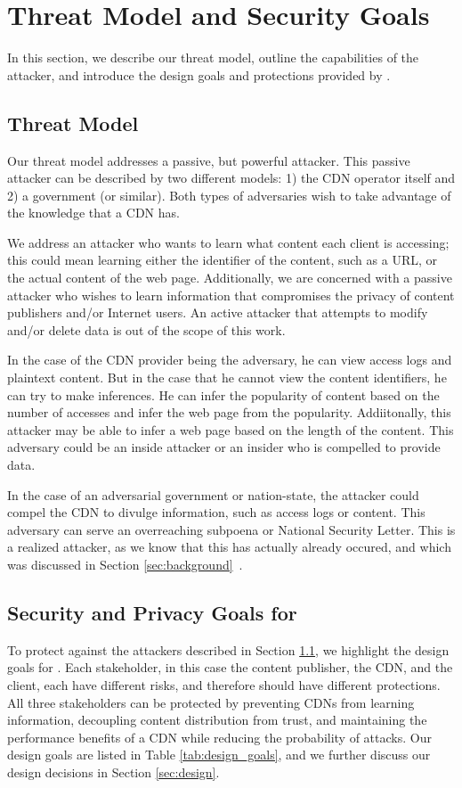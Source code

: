 \section{Threat Model and Security Goals}
\label{sec:threat}
In this section, we describe our threat model, outline the capabilities of the 
attacker, and introduce the design goals and protections provided by \system{}.

\subsection{Threat Model}
\label{sec:attacker}
Our threat model addresses a passive, but powerful attacker.  This passive attacker can 
be described by two different models: 1) the CDN operator itself and 2) a government (or similar). 
Both types of adversaries wish to take advantage of the knowledge that a CDN has.  

We address an attacker who wants to learn what content each client is accessing; this 
could mean learning either the identifier of the content, such as a URL, or the actual 
content of the web page.  Additionally, we are concerned with a passive attacker who 
wishes to learn information that compromises the privacy of content publishers and/or Internet 
users.  An active attacker that attempts to modify and/or delete data is out of the 
scope of this work.

In the case of the CDN provider being the adversary, he can view access logs and 
plaintext content. But in the case that he cannot view the content identifiers, he can try to make inferences. He 
can infer the popularity of content based on the number of accesses and infer the web page 
from the popularity. Addiitonally, this attacker may be able to infer a web page based on the length of the 
content.  This adversary could be an inside attacker or an insider who is 
compelled to provide data. 

In the case of an adversarial government or nation-state, the attacker could compel 
the CDN to divulge information, such as access logs or content.  This adversary can 
serve an overreaching subpoena or National Security Letter.  This is a realized 
attacker, as we know that this has actually already occured, and which was discussed 
in Section \ref{sec:background}~\cite{cloudflare_nsl}.

\subsection{Security and Privacy Goals for \system{}}
\label{sec:goals}
To protect against the attackers described in Section 
\ref{sec:attacker}, we highlight the design goals for \system{}. 
Each stakeholder, in this case the content publisher, the CDN, and the client, each have 
different risks, and therefore should have different protections.  All three stakeholders 
can be protected by preventing CDNs from learning information, decoupling content distribution from trust, and 
maintaining the performance benefits of a CDN while reducing the probability of attacks.  Our design goals are listed in Table \ref{tab:design_goals}, 
and we further discuss our design decisions in Section \ref{sec:design}.

